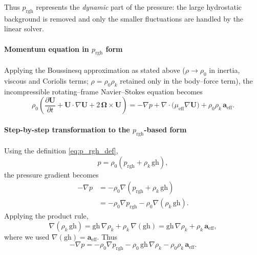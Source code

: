 \documentclass[11pt,a4paper]{article}
\begin{document}
Thus \(p_{\mathrm{rgh}}\) represents the \emph{dynamic} part of the
pressure: the large hydrostatic background is removed and only the
smaller fluctuations are handled by the linear solver.

\paragraph{Momentum equation in \(p_{\mathrm{rgh}}\) form}

Applying the Boussinesq approximation as stated above (\(\rho\to\rho_0\)
in inertia, viscous and Coriolis terms; \(\rho=\rho_0\rho_k\) retained
only in the body--force term), the incompressible rotating--frame
Navier--Stokes equation becomes
\begin{equation}
	\rho_0
	\left(
	\frac{\partial \boldsymbol{U}}{\partial t}
	+ \boldsymbol{U}\cdot\nabla\boldsymbol{U}
	+ 2\,\boldsymbol{\Omega}\times\boldsymbol{U}
	\right)
	=
	-\nabla p
	+ \nabla\cdot\bigl(\mu_{\mathrm{eff}}\nabla\boldsymbol{U}\bigr)
	+ \rho_0\rho_k\,\boldsymbol{a}_{\mathrm{eff}}.
	\label{eq:NS_raw}
\end{equation}

\paragraph{Step-by-step transformation to the \(p_{\mathrm{rgh}}\)-based form}

Using the definition \eqref{eq:p_rgh_def},
\[
p
= \rho_0\left(p_{\mathrm{rgh}} + \rho_k\,\mathrm{gh}\right),
\]
the pressure gradient becomes
\begin{align}
	-\nabla p
	&= -\rho_0 \nabla\!\left(p_{\mathrm{rgh}} + \rho_k\,\mathrm{gh}\right)
	\nonumber\\
	&= -\rho_0\nabla p_{\mathrm{rgh}}
	-\rho_0\nabla(\rho_k\,\mathrm{gh}).
\end{align}
Applying the product rule,
\begin{equation}
	\nabla(\rho_k\,\mathrm{gh})
	=
	\mathrm{gh}\,\nabla\rho_k
	+
	\rho_k\,\nabla(\mathrm{gh})
	=
	\mathrm{gh}\,\nabla\rho_k
	+
	\rho_k\,\boldsymbol{a}_{\mathrm{eff}},
\end{equation}
where we used \(\nabla(\mathrm{gh}) = \boldsymbol{a}_{\mathrm{eff}}\).
Thus
\begin{equation}
	-\nabla p
	=
	-\rho_0\nabla p_{\mathrm{rgh}}
	-\rho_0\,\mathrm{gh}\,\nabla\rho_k
	-\rho_0\rho_k\,\boldsymbol{a}_{\mathrm{eff}}.
	\label{eq:pressure_expanded}
\end{equation}
\end{document}

